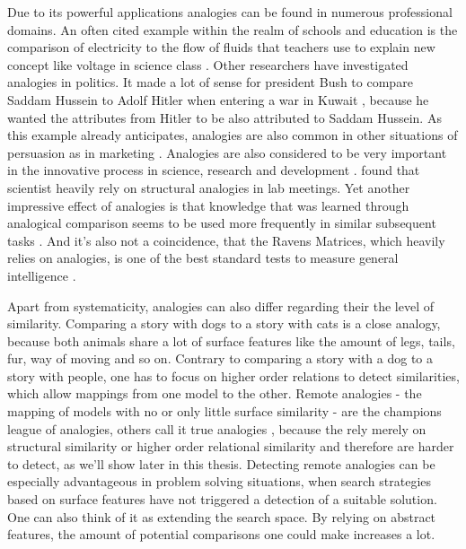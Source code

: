 \documentclass[a4paper,man,natbib,floatsintext,import]{apa6}
\begin{document}
Due to its powerful applications analogies can be found in numerous professional domains. An often cited example within the realm of schools and education is the comparison of electricity to the flow of fluids that teachers use to explain new concept like voltage in science class \citep{Treagust1992,Dupin1989,Gentner1982}. Other researchers have investigated analogies in politics. It made a lot of sense for president Bush to compare Saddam Hussein to Adolf Hitler when entering a war in Kuwait \citep{MacDonald2002}, because he wanted the attributes from Hitler to be also attributed to Saddam Hussein. As this example already anticipates, analogies are also common in other situations of persuasion as in marketing \citep{Herzenstein2014,Cornelissen2003}. Analogies are also considered to be very important in the innovative process in science, research and development \citep{Gentner2002}. \cite{Dunbar2001} found that scientist heavily rely on structural analogies in lab meetings. Yet another impressive effect of analogies is that knowledge that was learned through analogical comparison seems to be used more frequently in similar subsequent tasks \citep{Gentner2003a,Loewenstein1999}. And it's also not a coincidence, that the Ravens Matrices, which heavily relies on analogies, is one of the best standard tests to measure general intelligence \citep{Carpenter1990}.

Apart from systematicity, analogies can also differ regarding their the level of similarity. Comparing a story with dogs to a story with cats is a close analogy, because both animals share a lot of surface features like the amount of legs, tails, fur, way of moving and so on. Contrary to comparing a story with a dog to a story with people, one has to focus on higher order relations to detect similarities, which allow mappings from one model to the other. Remote analogies - the mapping of models with no or only little surface similarity - are the champions league of analogies, others call it true analogies \citep{Wharton1996}, because the rely merely on structural similarity or  higher order relational similarity \citep{Catrambone2002} and therefore are harder to detect, as we'll show later in this thesis. Detecting remote analogies can be especially advantageous in problem solving situations, when search strategies based on surface features have not triggered a detection of a suitable solution. One can also think of it as extending the search space. By relying on abstract features, the amount of potential comparisons one could make increases a lot.
\end{document}

